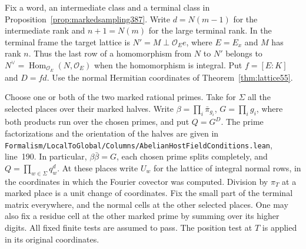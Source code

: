 \documentclass[a4paper,11pt]{article}
\theoremstyle{definition}
\theoremstyle{remark}
\newcommand{\srcloc}[2]{{\small\nolinkurl{#1.lean}}, line~#2}
\numberwithin{equation}{section}
\begin{document}
Fix a word, an intermediate class and a terminal class in
Proposition~\ref{prop:markedsampling387}. Write \(d=N(m-1)\) for the
intermediate rank and \(n+1=N(m)\) for the large terminal rank.
In the terminal frame the target lattice is
\(N'=M\perp\mathcal O_E e\), where \(E=E_x\) and \(M\) has rank
\(n\). Thus the last row of a homomorphism from \(N\) to \(N'\)
belongs to \(N^\vee=\operatorname{Hom}_{\mathcal O_E}(N,\mathcal O_E)\)
when the homomorphism is integral. Put \(f=[E:K]\) and \(D=fd\).
Use the normal Hermitian coordinates of Theorem~\ref{thm:lattice55}.

Choose one or both of the two marked rational primes. Take for
\(\Sigma\) all the selected places over their marked halves.
Write \(\beta=\prod_i\bar\pi_{g_i}\), \(G=\prod_i g_i\), where
both products run over the chosen primes, and put \(Q=G^D\).
The prime factorizations and the orientation of the halves are
given in \srcloc{Formalism/LocalToGlobal/Columns/AbelianHostFieldConditions}{190}.
In particular, \(\beta\bar\beta=G\), each chosen prime splits
completely, and
\(Q=\prod_{w\in\Sigma}q_w^d\). At these places write \(U_w\)
for the lattice of integral normal rows, in the coordinates in
which the Fourier covector was computed. Division by \(\pi_T\)
at a marked place is a unit change of coordinates.
Fix the small part of the terminal matrix everywhere, and the
normal cells at the other selected places. One may also fix a
residue cell at the other marked prime by summing over its higher
digits. All fixed finite tests are assumed to pass. The position
test at \(T\) is applied in its original coordinates.
\end{document}
